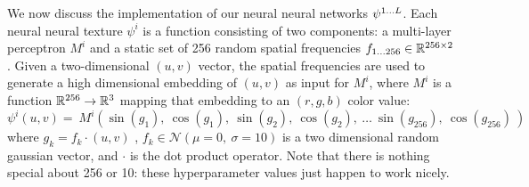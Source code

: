 \documentclass{article}
\begin{document}
		
		We now discuss the implementation of our neural neural networks $\psi^{1\dots L}$.
		Each neural neural texture $\psi^i$ is a function consisting of two components: a multi-layer perceptron $M^i$ and a static set of 256 random spatial frequencies $f_{1...256} \in \mathbb{R} ^ {256 \times 2}$. 
		Given a two-dimensional $(u,v)$ vector, the spatial frequencies are used to generate a high dimensional embedding of $(u,v)$ as input for $M^i$, where $M^i$ is a function $\mathbb{R}^{256} \to \mathbb{R}^{3}$ mapping that embedding to an $(r,g,b)$ color value:
		\begin{equation}
				\psi^i(u,v) = 
				\
				M^i(
					\sin( g_1      ) , \ 
					\cos( g_1      ) , \ 
					\sin( g_2      ) , \ 
					\cos( g_2      ) , \ 
					\dots \ 
					\sin( g_{256}  ) , \ 
					\cos( g_{256}  )  \ 
				)
		\end{equation}
		where $g_k=f_k\cdot(u,v)$
		, $f_k \in \mathcal{N}(\mu=0,\ \sigma=10)$ is a two dimensional random gaussian vector,
		and $\cdot$ is the dot product operator.
		Note that there is nothing special about 256 or 10: these hyperparameter values just happen to work nicely.
		
\end{document}
